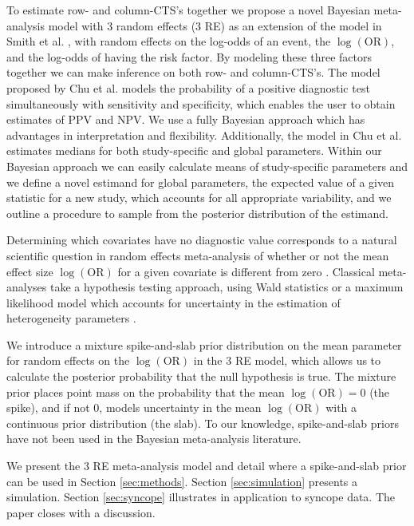 \documentclass[AMA,STIX1COL]{WileyNJD-v2}
\begin{document}
To estimate row- and column-CTS's together we propose a novel Bayesian meta-analysis model with 3 random effects (3 RE) as an extension of the model in Smith et al. \cite{smith1995}, with random effects on the log-odds of an event, the $\log(\mbox{OR})$, and the log-odds of having the risk factor. By modeling these three factors together we can make inference on both row- and column-CTS's. The model proposed by Chu et al. \cite{chu2009} models the probability of a positive diagnostic test simultaneously with sensitivity and specificity, which enables the user to obtain estimates of PPV and NPV. We use a fully Bayesian approach which has advantages in interpretation and flexibility. Additionally, the model in Chu et al. estimates medians for both study-specific and global parameters. Within our Bayesian approach we can easily calculate means of study-specific parameters and we define a novel estimand for global parameters, the expected value of a given statistic for a new study, which accounts for all appropriate variability, and we outline a procedure to sample from the posterior distribution of the estimand. 

Determining which covariates have no diagnostic value corresponds to a natural scientific question in random effects meta-analysis of whether or not the mean effect size $\log(\mbox{OR})$ for a given covariate is different from zero \cite{higgins2009}. Classical meta-analyses take a hypothesis testing approach, using Wald statistics \cite{higgins2009, follmann1999} or a maximum likelihood model which accounts for uncertainty in the estimation of heterogeneity parameters \cite{hardy1996}. 

We introduce a mixture spike-and-slab prior distribution \cite{GM1993, GM1997, KM1998, ishwaran2005} on the mean parameter for random effects on the $\log(\mbox{OR})$ in the 3 RE model, which allows us to calculate the posterior probability that the null hypothesis is true. The mixture prior places point mass on the probability that the mean $\log(\mbox{OR}) = 0$ (the spike), and if not 0, models uncertainty in the mean $\log(\mbox{OR})$ with a continuous prior distribution (the slab). To our knowledge, spike-and-slab priors have not been used in the Bayesian meta-analysis literature. 

We present the 3 RE meta-analysis model and detail where a spike-and-slab prior can be used in Section \ref{sec:methods}. Section \ref{sec:simulation} presents a simulation. Section \ref{sec:syncope} illustrates in application to syncope data. The paper closes with a discussion. 
\end{document}
